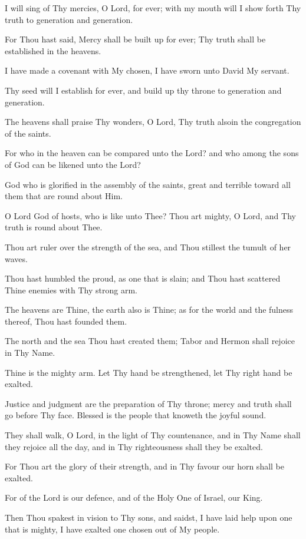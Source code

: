 I will sing of Thy mercies, O Lord, for ever; with my mouth will I show forth Thy truth to generation and generation.

For Thou hast said, Mercy shall be built up for ever; Thy truth shall be established in the heavens.

I have made a covenant with My chosen, I have sworn unto David My servant.

Thy seed will I establish for ever, and build up thy throne to generation and generation.

The heavens shall praise Thy wonders, O Lord, Thy truth alsoin the congregation of the saints.

For who in the heaven can be compared unto the Lord? and who among the sons of God can be likened unto the Lord?

God who is glorified in the assembly of the saints, great and terrible toward all them that are round about Him.

O Lord God of hosts, who is like unto Thee? Thou art mighty, O Lord, and Thy truth is round about Thee.

Thou art ruler over the strength of the sea, and Thou stillest the tumult of her waves.

Thou hast humbled the proud, as one that is slain; and Thou hast scattered Thine enemies with Thy strong arm.

The heavens are Thine, the earth also is Thine; as for the world and the fulness thereof, Thou hast founded them.

The north and the sea Thou hast created them; Tabor and Hermon shall rejoice in Thy Name.

Thine is the mighty arm. Let Thy hand be strengthened, let Thy right hand be exalted.

Justice and judgment are the preparation of Thy throne; mercy and truth shall go before Thy face. Blessed is the people that knoweth the joyful sound.

They shall walk, O Lord, in the light of Thy countenance, and in Thy Name shall they rejoice all the day, and in Thy righteousness shall they be exalted.

For Thou art the glory of their strength, and in Thy favour our horn shall be exalted.

For of the Lord is our defence, and of the Holy One of Israel, our King.

Then Thou spakest in vision to Thy sons, and saidst, I have laid help upon one that is mighty, I have exalted one chosen out of My people.

